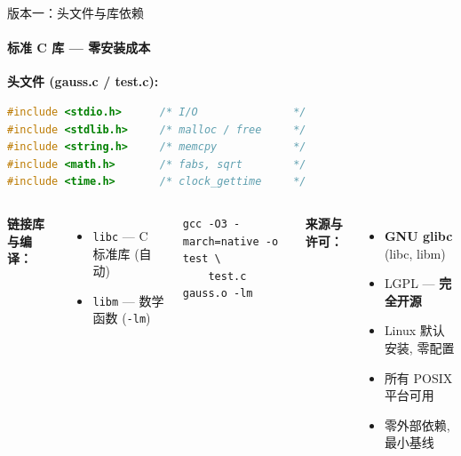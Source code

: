 \documentclass[12pt,aspectratio=169]{beamer}
\begin{document}
\begin{frame}[fragile]{版本一：头文件与库依赖}
\framesubtitle{标准 C 库 — 零安装成本}

\textbf{头文件 (gauss.c / test.c):}
\begin{lstlisting}[language=C,basicstyle=\ttfamily\footnotesize,belowskip=-2pt,aboveskip=0pt,numbers=none]
#include <stdio.h>      /* I/O               */
#include <stdlib.h>     /* malloc / free     */
#include <string.h>     /* memcpy            */
#include <math.h>       /* fabs, sqrt        */
#include <time.h>       /* clock_gettime     */
\end{lstlisting}

\vspace{4pt}
\footnotesize
\begin{columns}[T]
\textbf{链接库与编译：}
\begin{itemize}\itemsep0pt
  \item \texttt{libc} — C 标准库 (自动)
  \item \texttt{libm} — 数学函数 (\texttt{-lm})
\end{itemize}
\begin{lstlisting}[basicstyle=\ttfamily\scriptsize,belowskip=-2pt,aboveskip=0pt,numbers=none]
gcc -O3 -march=native -o test \
    test.c gauss.o -lm
\end{lstlisting}

\textbf{来源与许可：}
\begin{itemize}\itemsep0pt
  \item \textbf{GNU glibc} (libc, libm)
  \item LGPL — \textbf{完全开源}
  \item Linux 默认安装, 零配置
  \item 所有 POSIX 平台可用
  \item 零外部依赖, 最小基线
\end{itemize}
\end{columns}
\end{frame}
\end{document}
